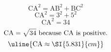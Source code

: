 \[\text{CA}^{2}=\text{AB}^{2}+\text{BC}^{2}\]
\[\text{CA}^{2}=3^{2}+5^{2}\]
\[\text{CA}^{2}=34\]
\[\text{CA}=\sqrt{\mathstrut 34}\text{ because CA is positive.}\]
\[\uline{\text{CA}\approx\SI{5.831}{cm}}\]